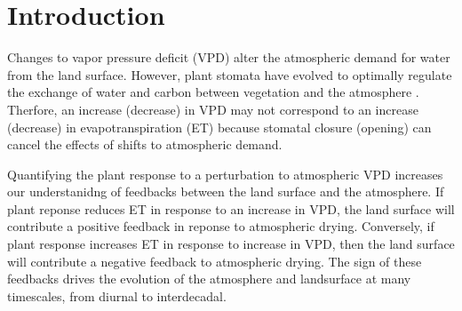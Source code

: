 \documentclass[draft,linenumbers]{agujournal}
\begin{document}

%
% 
% 
% 


\section{Introduction}

Changes to vapor pressure deficit (VPD) alter the atmospheric demand for water from the land surface. However, plant stomata have evolved to optimally regulate the exchange of water and carbon between vegetation and the atmosphere \citep{Franks_2017}. Therfore, an increase (decrease) in VPD may not correspond to an increase (decrease) in evapotranspiration (ET) because stomatal closure (opening) can cancel the effects of shifts to atmospheric demand.

Quantifying the plant response to a perturbation to atmospheric VPD increases our understanidng of feedbacks between the land surface and the atmosphere. If plant reponse reduces ET in response to an increase in VPD, the land surface will contribute a positive feedback in reponse to atmospheric drying. Conversely, if plant response increases ET in response to increase in VPD, then the land surface will contribute a negative feedback to atmospheric drying. The sign of these feedbacks drives the evolution of the atmosphere and landsurface at many timescales, from diurnal to interdecadal. 
\end{document}
